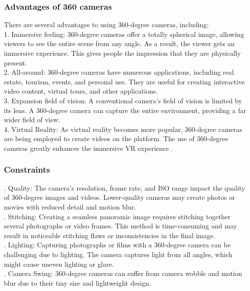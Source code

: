 \subsubsection{Advantages of 360 cameras}
There are several advantages to using 360-degree cameras, including:  \\
1. Immersive feeling: 360-degree cameras offer a totally spherical image, allowing viewers to see the entire scene from any angle. As a result, the viewer gets an immersive experience. This gives people the impression that they are physically present. \\
2. All-around: 360-degree cameras have numerous applications, including real estate, tourism, events, and personal use. They are useful for creating interactive video content, virtual tours, and other applications. \\
3. Expansion field of vision: A conventional camera's field of vision is limited by its lens. A 360-degree camera can capture the entire environment, providing a far wider field of view. \\
4. Virtual Reality: As virtual reality becomes more popular, 360-degree cameras are being employed to create videos on the platform. The use of 360-degree cameras greatly enhances the immersive VR experience \cite{karkhanis2023complete}. \\
\subsubsection{Constraints} 
. Quality: The camera's resolution, frame rate, and ISO range impact the quality of 360-degree images and videos. Lower-quality cameras may create photos or movies with reduced detail and motion blur. \\

. Stitching: Creating a seamless panoramic image requires stitching together several photographs or video frames. This method is time-consuming and may result in noticeable stitching flaws or inconsistencies in the final image. \\

. Lighting: Capturing photographs or films with a 360-degree camera can be challenging due to lighting. The camera captures light from all angles, which might cause uneven lighting or glare. \\

. Camera Swing: 360-degree cameras can suffer from camera wobble and motion blur due to their tiny size and lightweight design. \\

